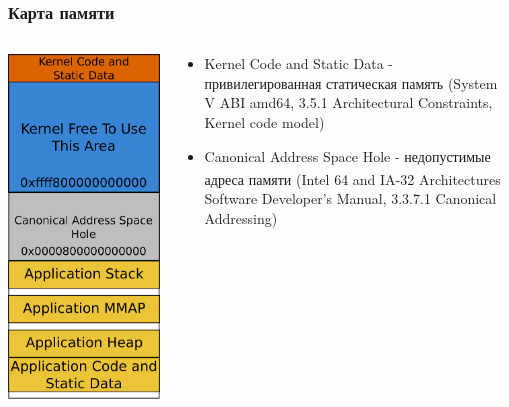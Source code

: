 \begin{frame}
\frametitle{Карта памяти}

\begin{columns}[T]

  \begin{column}{.4\textwidth}
    \includegraphics[width=.8\linewidth]{memmap}
  \end{column}

  \begin{column}{.6\textwidth}
    \begin{itemize}
      \item Kernel Code and Static Data - привилегированная статическая память (System V ABI amd64, 3.5.1 Architectural Constraints, Kernel code model)
      \item Canonical Address Space Hole - недопустимые адреса памяти (Intel\textsuperscript{\textregistered} 64 and IA-32 Architectures Software Developer's Manual, 3.3.7.1 Canonical Addressing)
    \end{itemize}
  \end{column}
\end{columns}


\end{frame}
